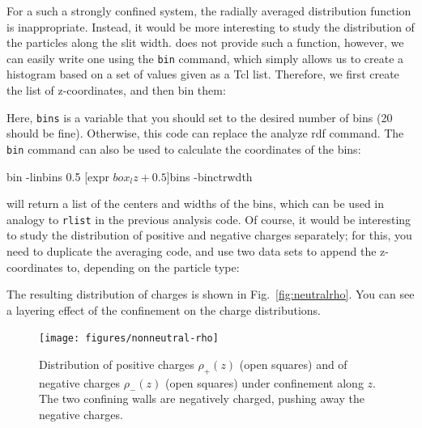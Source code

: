 \documentclass[
a4paper,                        %
11pt,                           %
twoside,                        %
footsepline,                    %
headsepline,                    %
headexclude,                    %
footexclude,                    %
pagesize,                       %
]{scrartcl}
\begin{document}
For a such a strongly confined system, the radially averaged
distribution function is inappropriate. Instead, it would be more
interesting to study the distribution of the particles along the slit
width. \es{}  does not provide such a function, however, we can easily
write one using the \verb|bin| command, which simply allows us 
to create a histogram based on a set of values given as a Tcl list.
Therefore, we first create the list
of z-coordinates, and then bin them:


Here, \verb|bins| is a variable that you should set to the desired
number of bins (20 should be fine). Otherwise, this code can replace
the analyze rdf command. The \verb|bin| command can also be used to
calculate the coordinates of the bins:

\begin{tclcode}
  bin -linbins 0.5 [expr $box_lz + 0.5] $bins -binctrwdth
\end{tclcode}

will return a list of the centers and widths of the bins, which can be
used in analogy to \verb|rlist| in the previous analysis code. Of
course, it would be interesting to study the distribution of positive
and negative charges separately; for this, you need to duplicate the
averaging code, and use two data sets to append the z-coordinates to,
depending on the particle type:


The resulting distribution of charges is shown in
Fig.~\ref{fig:neutralrho}. You can see a layering effect of the
confinement on the charge distributions.

\begin{figure}[h]
  \centering
  \texttt{[image: figures/nonneutral-rho]}
  \caption{Distribution of positive charges $\rho_+(z)$ (open squares)
    and of negative charges $\rho_-(z)$ (open squares) under
    confinement along $z$. The two confining walls are negatively
    charged, pushing away the negative charges.}
  \label{fig:nonneutralrho}
\end{figure}
\end{document}
